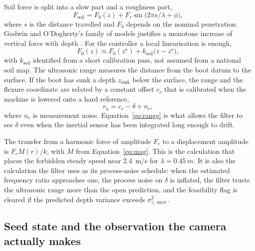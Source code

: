 Soil force is split into a slow part and a roughness part,
\begin{equation}
\label{eq:fsoil}
F_{\mathrm{soil}} = F_0(z) + F_r \sin\bigl(2\pi s/\lambda + \phi\bigr),
\end{equation}
where \(s\) is the distance travelled and \(F_0\) depends on the nominal penetration. Godwin and O'Dogherty's family of models justifies a monotone increase of vertical force with depth \cite{godwin2007}. For the controller a local linearisation is enough,
\begin{equation}
\label{eq:flinear}
F_0(z) \approx F_0(z^{\star}) + k_{\mathrm{soil}}\bigl(z-z^{\star}\bigr),
\end{equation}
with \(k_{\mathrm{soil}}\) identified from a short calibration pass, not assumed from a national soil map. The ultrasonic range measures the distance from the boot datum to the surface. If the boot has sunk a depth \(z_{\mathrm{sink}}\) below the surface, the range and the flexure coordinate are related by a constant offset \(c_r\) that is calibrated when the machine is lowered onto a hard reference,
\begin{equation}
\label{eq:range}
r_u = c_r - \delta + n_r,
\end{equation}
where \(n_r\) is measurement noise. Equation~\eqref{eq:range} is what allows the filter to see \(\delta\) even when the inertial sensor has been integrated long enough to drift.

The transfer from a harmonic force of amplitude \(F_r\) to a displacement amplitude is \(F_r M(r)/k\), with \(M\) from Equation~\eqref{eq:mag}. This is the calculation that places the forbidden steady speed near \SI{2.4}{m/s} for \(\lambda=\SI{0.45}{m}\). It is also the calculation the filter uses as its process-noise schedule: when the estimated frequency ratio approaches one, the process noise on \(\delta\) is inflated, the filter trusts the ultrasonic range more than the open prediction, and the feasibility flag is cleared if the predicted depth variance exceeds \(\sigma_{z,\max}^2\).

\subsection{Seed state and the observation the camera actually makes}

